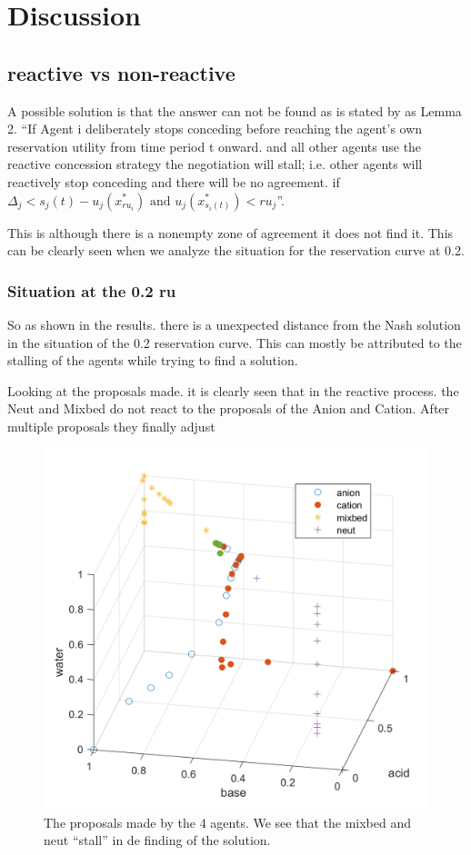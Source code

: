 \clearpage
\section{Discussion}
\subsection{reactive vs non-reactive}
A possible solution is that the answer can not be found as is stated by \citet{zheng2015automated} as Lemma 2. ``If Agent i deliberately stops conceding before reaching the agent's own reservation utility from time period t onward. and all other agents use the reactive concession strategy the negotiation will stall; i.e. other agents will reactively stop conceding and there will be no agreement. if $\Delta_j < s_j(t)-u_j(x^*_{ru_i}) \text{ and } u_j(x^*_{s_i(t)})<ru_j$''.

This is although there is a nonempty zone of agreement it does not find it. This can be clearly seen when we analyze the situation for the reservation curve at 0.2.

\subsubsection{Situation at the 0.2 ru}
So as shown in the results. there is a unexpected distance from the Nash solution in the situation of the 0.2 reservation curve. This can mostly be attributed to the stalling of the agents while trying to find a solution.

Looking at the proposals made. it is clearly seen that in the reactive process. the Neut and Mixbed do not react to the proposals of the Anion and Cation. After multiple proposals they finally adjust 

\begin{figure}[h]
	\centering
	\includegraphics[width=0.7\linewidth]{img/reactive_4_plot}
	\caption{The proposals made by the 4 agents. We see that the mixbed and neut ``stall'' in de finding of the solution.}
	\label{fig:reactive4plot}
\end{figure}

